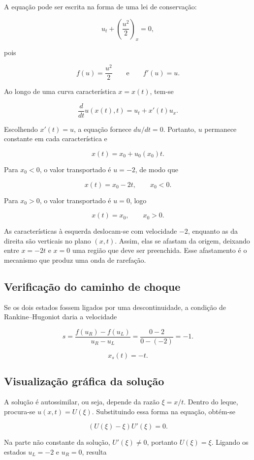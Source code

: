\documentclass[
    12pt,
    oneside,
    a4paper,
    english,
    brazilian,
    chapter=TITLE,
    sumario=tradicional
]{abntex2}
\begin{document}
A equação pode ser escrita na forma de uma lei de conservação:

\[
    u_t+\left(\frac{u^2}{2}\right)_x=0,
\]

pois

\[
    f(u)=\frac{u^2}{2}
    \qquad\text{e}\qquad
    f'(u)=u.
\]

Ao longo de uma curva característica $x=x(t)$, tem-se

\[
    \frac{d}{dt}u(x(t),t)
    =
    u_t+x'(t)u_x.
\]

Escolhendo $x'(t)=u$, a equação fornece $du/dt=0$. Portanto, $u$
permanece constante em cada característica e

\[
    x(t)=x_0+u_0(x_0)t.
\]

Para $x_0<0$, o valor transportado é $u=-2$, de modo que

\[
    \boxed{x(t)=x_0-2t,\qquad x_0<0.}
\]

Para $x_0>0$, o valor transportado é $u=0$, logo

\[
    \boxed{x(t)=x_0,\qquad x_0>0.}
\]

As características à esquerda deslocam-se com velocidade $-2$, enquanto as da
direita são verticais no plano $(x,t)$. Assim, elas se afastam da origem,
deixando entre $x=-2t$ e $x=0$ uma região que deve ser preenchida. Esse
afastamento é o mecanismo que produz uma onda de rarefação.

\subsection{Verificação do caminho de choque}

Se os dois estados fossem ligados por uma descontinuidade, a condição de
Rankine--Hugoniot daria a velocidade

\[
    s
    =
    \frac{f(u_R)-f(u_L)}{u_R-u_L}
    =
    \frac{0-2}{0-(-2)}
    =
    -1.
\]

\[
    \boxed{x_s(t)=-t.}
\]

\subsection{Visualização gráfica da solução}

A solução é autossimilar, ou seja, depende da razão
$\xi=x/t$. Dentro do leque, procura-se $u(x,t)=U(\xi)$. Substituindo essa
forma na equação, obtém-se

\[
    \left(U(\xi)-\xi\right)U'(\xi)=0.
\]

Na parte não constante da solução, $U'(\xi)\neq0$, portanto
$U(\xi)=\xi$. Ligando os estados $u_L=-2$ e $u_R=0$, resulta
\end{document}
